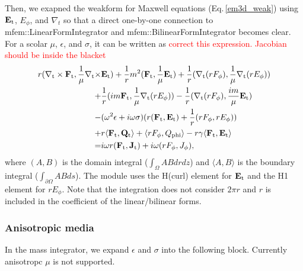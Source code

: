 \documentclass[11pt,a4paper,final]{report}
\begin{document}
Then, we exapned the weakform for Maxwell equations (Eq.\,\ref{em3d_weak}) using $\mathbf{E}_{\rm t}$, $E_{\phi}$, and $\nabla_{t}$ so that a direct one-by-one connection to mfem::LinearFormIntegrator and mfem::BilinearFormIntegrator becomes clear.
For a scolar $\mu$, $\epsilon$, and $\sigma$, it can be written as \textcolor{red}{correct this expression. Jacobian should be inside the blacket}
 \begin{align}
r(\nabla_{\rm t} \times \mathbf{F}_{\rm t},  \frac{1}{\mu}\nabla_{\rm t}  \times & \mathbf{E}_{\rm t}) 
+\frac{1}{r} m^2(\mathbf{F}_{\rm t}, \frac{1}{\mu}\mathbf{E}_{\rm t})
+ \frac{1}{r} (\nabla_{\rm t} (rF_{\rm \phi}), \frac{1}{\mu}\nabla_{\rm t} (rE_{\rm \phi}))
 \notag \\
+& \frac{1}{r} (im \mathbf{F}_{\rm t}, \frac{1}{\mu}\nabla_{\rm t} (rE_{\rm \phi}))
- \frac{1}{r} (\nabla_{\rm t} (rF_{\rm \phi}), \frac{im}{\mu} \mathbf{E}_{\rm t})
 \notag \\
 -& (\omega^2 \epsilon+ i \omega \sigma) ( r( \mathbf{F}_{\rm t}, \mathbf{E}_{\rm t}) + \frac{1}{r}(rF_{\rm \phi}, rE_{\rm \phi})) 
 \notag \\
 +& r \langle \mathbf{F}_{\rm t},  \mathbf{Q}_{\rm t} \rangle + \langle rF_{\rm \phi}, Q_{\rm phi} \rangle -r \gamma \langle \mathbf{F}_{\rm t}, \mathbf{E}_{\rm t} \rangle
 \notag \\
 =& i \omega r ( \mathbf{F}_{\rm t}, \mathbf{J}_{\rm t} ) + i \omega ( rF_{\rm \phi}, J_{\rm \phi} ), \label{em2da_weak}
 \end{align}
 where $(A , B)$ is the domain integral ($\int_{\Omega} AB drdz$) and $\langle A, B \rangle $ is the boundary integral ($\int_{\partial \Omega} ABds$). The module uses the H(curl) element for $\mathbf{E}_{\rm t}$ and the H1 element for $rE_{\phi}$. Note that the integration does not consider $2 \pi r$ and $r$ is included in the coefficient of the linear/bilinear forms. 
 
 \subsubsection{Anisotropic media}
 
In the mass integrator, we expand $\epsilon$ and $\sigma$ into the following block. Currently anisotropc $\mu$ is not supported.
\end{document}
